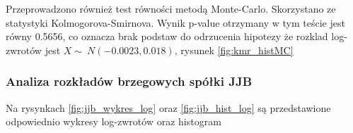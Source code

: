 \documentclass[a4paper,11pt]{article}
\begin{document}
Przeprowadzono również test równości metodą Monte-Carlo. Skorzystano ze statystyki Kolmogorova-Smirnova. Wynik p-value otrzymany w tym teście jest równy 0.5656, co oznacza brak podstaw do odrzucenia hipotezy że rozklad log-zwrotów jest  $X \sim\ N(-0.0023, 0.018)$, rysunek \ref{fig:kmr_histMC}



\subsubsection{Analiza rozkładów brzegowych spółki JJB}

Na rysynkach \ref{fig:jjb_wykres_log} oraz \ref{fig:jjb_hist_log} są przedstawione odpowiednio wykresy log-zwrotów oraz histogram
\begin{figure}[!htb]
    \centering


\end{figure}
\end{document}
